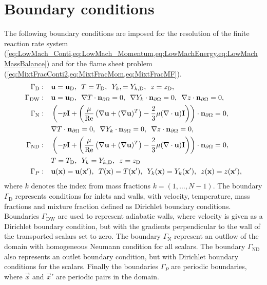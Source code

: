 \section{Boundary conditions}
The following boundary conditions are imposed for the resolution of the finite reaction rate system (\cref{eq:LowMach_Conti,eq:LowMach_Momentum,eq:LowMachEnergy,eq:LowMachMassBalance}) and for the flame sheet problem (\cref{eq:MixtFracConti2,eq:MixtFracMom,eq:MixtFracMF}).
\begin{subequations} 	
	\begin{align}
	\Gamma_{\text{D}}:\quad 
	&	\textbf{u} = \textbf{u}_{\text{D}},
	\,\,\,
	T = T_{\text{D}},
	\,\,\,
	Y_{k}, =Y_{k,{\text{D}}},
	\,\,\,
	z = z_{\text{D}},
	\label{eq:bc_d}\\
	\Gamma_{{\text{DW}}}:\quad
	&	\textbf{u} = \textbf{u}_{\text{D}},
	\,\,\,
	\nabla T \cdot \textbf{n}_{\partial \Omega} = 0,
	\,\,\,
	\nabla Y_{k} \cdot  \textbf{n}_{\partial \Omega}= 0,
	\,\,\, 		
	\nabla z \cdot \textbf{n}_{\partial \Omega} = 0,
	\label{eq:bc_dn}\\			
	\Gamma_{\text{N}}: \quad
	&	\left( -p \mathbf{I}	+ \left(\frac{\mu}{\text{Re}} \left(\nabla \textbf{u} + (\nabla \textbf{u})^T\right) - \frac{2}{3}\mu(\nabla \cdot \textbf{u})\mathbf{I}\right)\right)\cdot  \textbf{n}_{\partial \Omega} 	= 0, 
	\,\,\,\notag\\
	&
	\nabla T \cdot \textbf{n}_{\partial \Omega} = 0,
	\,\,\,
	\nabla  Y_{k} \cdot \textbf{n}_{\partial \Omega}= 0,
	\,\,\, 		
	\nabla z \cdot \textbf{n}_{\partial \Omega} = 0,
	\label{eq:bc_O}\\
	\Gamma_{\text{ND}}:\quad
	&	\left( -p \mathbf{I}	+ \left(\frac{\mu}{\text{Re}} \left(\nabla \textbf{u} + (\nabla \textbf{u})^T\right) - \frac{2}{3}\mu(\nabla \cdot \textbf{u})\mathbf{I}\right)\right)\cdot  \textbf{n}_{\partial \Omega} 	= 0, 
	\,\,\,\notag\\
	&T = T_{\text{D}},
	\,\,\,
	Y_{k} =  Y_{k,{\text{D}}},
	\,\,\,
	z = z_{\text{D}} 
	\label{eq:bc_OD}\\	
	\Gamma_{P}:\quad
	&	\textbf{u}(\textbf{x}) = \textbf{u}(\textbf{x}'),
	\,\,\,
	T(\textbf{x}) = T(\textbf{x}'),
	\,\,\,
	Y_{k}(\textbf{x}) =  Y_{k}(\textbf{x}'),
	\,\,\,
	z(\textbf{x}) = z(\textbf{x}'),
	\label{eq:bc_P}	
	\end{align}	
\end{subequations} 
where $k$ denotes the index from mass fractions $k = (1,\dots,N-1)$. The boundary $\Gamma_\text{D}$ represents conditions for inlets and walls, with velocity, temperature, mass fractions and mixture fraction defined as Dirichlet boundary conditions. Boundaries $\Gamma_\text{DW}$  are used to represent adiabatic walls, where velocity is given as a Dirichlet boundary condition, but with the gradients perpendicular to the wall of the transported scalars set to zero. The boundary $\Gamma_\text{N}$ represent an outflow of the domain with homogeneous Neumann condition for all scalars. The boundary $\Gamma_{\text{ND}}$ also  represents an outlet boundary condition, but with Dirichlet boundary conditions for the scalars. Finally the boundaries $\Gamma_P$ are periodic boundaries, where $\vec{x}$ and $\vec{x}'$ are periodic pairs in the domain.



